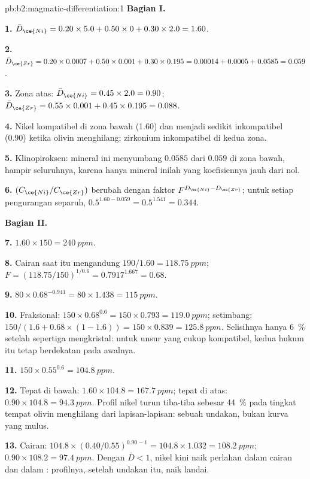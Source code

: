\begin{solution}{pb:b2:magmatic-differentiation:1}
\noindent\textbf{Bagian I.}

\textbf{1.} $\bar D_{\ce{Ni}} = 0.20\times5.0 + 0.50\times0 + 0.30\times2.0 = 1.60$.

\textbf{2.} $\bar D_{\ce{Zr}} = 0.20\times0.0007 + 0.50\times0.001 + 0.30\times0.195 =
0.00014 + 0.0005 + 0.0585 = 0.059$.

\textbf{3.} Zona atas: $\bar D_{\ce{Ni}} = 0.45\times2.0 = 0.90$; $\bar D_{\ce{Zr}} =
0.55\times0.001 + 0.45\times0.195 = 0.088$.

\textbf{4.} Nikel kompatibel di zona bawah (1.60) dan menjadi sedikit
inkompatibel (0.90) ketika olivin menghilang; zirkonium inkompatibel di kedua zona.

\textbf{5.} Klinopiroksen: mineral ini menyumbang $0.0585$ dari $0.059$ di zona bawah, hampir
seluruhnya, karena hanya mineral inilah yang koefisiennya jauh dari nol.

\textbf{6.} $(C_{\ce{Ni}}/C_{\ce{Zr}})$ berubah dengan faktor $F^{D_{\ce{Ni}} - D_{\ce{Zr}}}$;
untuk setiap pengurangan separuh, $0.5^{1.60 - 0.059} = 0.5^{1.541} = 0.344$.

\noindent\textbf{Bagian II.}

\textbf{7.} $1.60\times150 = \qty{240}{ppm}$.

\textbf{8.} Cairan saat itu mengandung $190/1.60 = \qty{118.75}{ppm}$; $F = (118.75/150)^{1/0.6} =
0.7917^{1.667} = 0.68$.

\textbf{9.} $80\times0.68^{-0.941} = 80\times1.438 = \qty{115}{ppm}$.

\textbf{10.} Fraksional: $150\times0.68^{0.6} = 150\times0.793 = \qty{119.0}{ppm}$;
setimbang: $150/(1.6 + 0.68\times(1 - 1.6)) = 150\times0.839 = \qty{125.8}{ppm}$.
Selisihnya hanya \qty{6}{\percent} setelah sepertiga 
mengkristal: untuk unsur yang cukup kompatibel, kedua hukum itu tetap berdekatan pada awalnya.

\textbf{11.} $150\times0.55^{0.6} = \qty{104.8}{ppm}$.

\textbf{12.} Tepat di bawah: $1.60\times104.8 = \qty{167.7}{ppm}$; tepat di atas:
$0.90\times104.8 = \qty{94.3}{ppm}$. Profil nikel  turun
tiba-tiba sebesar \qty{44}{\percent} pada tingkat tempat olivin menghilang dari
lapisan-lapisan: sebuah undakan, bukan kurva yang mulus.

\textbf{13.} Cairan: $104.8\times(0.40/0.55)^{0.90 - 1} = 104.8\times1.032 =
\qty{108.2}{ppm}$;  $0.90\times108.2 = \qty{97.4}{ppm}$. Dengan $\bar D < 1$,
nikel kini naik perlahan dalam cairan dan dalam : profilnya, setelah
undakan itu, naik landai.


\end{solution}
